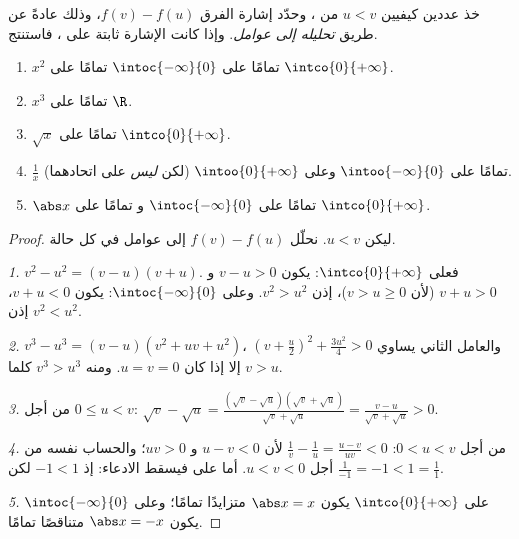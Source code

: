 \begin{method}\label{met:g11:func:variation}
خذ عددين كيفيين $u < v$ من ، وحدّد إشارة
الفرق $f(v) - f(u)$، وذلك عادةً عن طريق \emph{تحليله إلى عوامل}. وإذا كانت
الإشارة ثابتة على ، فاستنتج.
\end{method}

\begin{proposition}\label{prop:g11:func:refvariations}
\begin{enumerate}
  \item $x^2$  تمامًا على $\intoc{-\infty}{0}$ 
        تمامًا على $\intco{0}{+\infty}$.
  \item $x^3$  تمامًا على $\R$.
  \item $\sqrt x$  تمامًا على $\intco{0}{+\infty}$.
  \item $\frac1x$  تمامًا على $\intoo{-\infty}{0}$ وعلى
        $\intoo{0}{+\infty}$ (لكن \emph{ليس} على اتحادهما).
  \item $\abs x$  تمامًا على $\intoc{-\infty}{0}$ و
         تمامًا على $\intco{0}{+\infty}$.
\end{enumerate}
\end{proposition}

\begin{proof}
ليكن $u < v$. نحلّل $f(v) - f(u)$ إلى عوامل في كل حالة.

\emph{1.} $v^2 - u^2 = (v-u)(v+u)$. فعلى $\intco{0}{+\infty}$: يكون $v - u > 0$
و $v + u > 0$ (لأن $v > u \geq 0$)، إذن $v^2 > u^2$. وعلى
$\intoc{-\infty}{0}$: يكون $v + u < 0$، إذن $v^2 < u^2$.

\emph{2.} $v^3 - u^3 = (v - u)(v^2 + uv + u^2)$، والعامل الثاني
يساوي $\left(v + \frac u2\right)^2 + \frac{3u^2}{4} > 0$ إلا إذا كان
$u = v = 0$. ومنه $v^3 > u^3$ كلما $v > u$.

\emph{3.} من أجل $0 \leq u < v$:
$\sqrt v - \sqrt u = \frac{(\sqrt v - \sqrt u)(\sqrt v + \sqrt u)}
{\sqrt v + \sqrt u} = \frac{v - u}{\sqrt v + \sqrt u} > 0$.

\emph{4.} من أجل $0 < u < v$:
$\frac1v - \frac1u = \frac{u - v}{uv} < 0$ لأن $u - v < 0$ و $uv > 0$؛
والحساب نفسه من أجل $u < v < 0$. أما على  فيسقط الادعاء:
إذ $-1 < 1$ لكن $\frac{1}{-1} = -1 < 1 = \frac11$.

\emph{5.} على $\intco{0}{+\infty}$ يكون $\abs x = x$ متزايدًا تمامًا؛ وعلى
$\intoc{-\infty}{0}$ يكون $\abs x = -x$ متناقصًا تمامًا.
\end{proof}

